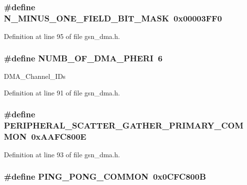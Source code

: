 \hypertarget{a00484_af41f9d4a535f48887520e136af1c4db1}{
\subsubsection[{N\_\-MINUS\_\-ONE\_\-FIELD\_\-BIT\_\-MASK}]{\setlength{\rightskip}{0pt plus 5cm}\#define N\_\-MINUS\_\-ONE\_\-FIELD\_\-BIT\_\-MASK~0x00003FF0}}
\label{a00484_af41f9d4a535f48887520e136af1c4db1}


Definition at line 95 of file gsn\_\-dma.h.

\hypertarget{a00484_ae8e73cb3b2b2a19fc917950debfee711}{
\subsubsection[{NUMB\_\-OF\_\-DMA\_\-PHERI}]{\setlength{\rightskip}{0pt plus 5cm}\#define NUMB\_\-OF\_\-DMA\_\-PHERI~6}}
\label{a00484_ae8e73cb3b2b2a19fc917950debfee711}
DMA\_\-Channel\_\-IDs 

Definition at line 91 of file gsn\_\-dma.h.

\hypertarget{a00484_aca65a0bf3bfd12532c02dae5c279e8ea}{
\subsubsection[{PERIPHERAL\_\-SCATTER\_\-GATHER\_\-PRIMARY\_\-COMMON}]{\setlength{\rightskip}{0pt plus 5cm}\#define PERIPHERAL\_\-SCATTER\_\-GATHER\_\-PRIMARY\_\-COMMON~0xAAFC800E}}
\label{a00484_aca65a0bf3bfd12532c02dae5c279e8ea}


Definition at line 93 of file gsn\_\-dma.h.

\hypertarget{a00484_a77c40078080da55358bb95deabdc19d2}{
\subsubsection[{PING\_\-PONG\_\-COMMON}]{\setlength{\rightskip}{0pt plus 5cm}\#define PING\_\-PONG\_\-COMMON~0x0CFC800B}}
\label{a00484_a77c40078080da55358bb95deabdc19d2}


